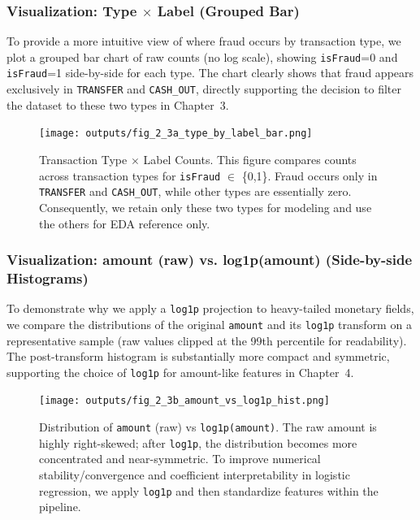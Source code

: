 \documentclass[sigplan,screen]{acmart}
\begin{document}
\subsubsection{Visualization: Type \texorpdfstring{$\times$}{x} Label (Grouped Bar)}
To provide a more intuitive view of where fraud occurs by transaction type, we plot a grouped bar chart of raw counts (no log scale), showing \texttt{isFraud}=0 and \texttt{isFraud}=1 side-by-side for each type. The chart clearly shows that fraud appears exclusively in \texttt{TRANSFER} and \texttt{CASH\_OUT}, directly supporting the decision to filter the dataset to these two types in Chapter~3.
\begin{figure}[h]
  \centering
  \texttt{[image: outputs/fig\_2\_3a\_type\_by\_label\_bar.png]}
  \caption{Transaction Type \texorpdfstring{$\times$}{x} Label Counts. This figure compares counts across transaction types for \texttt{isFraud} \texorpdfstring{$\in$}{∈} \{0,1\}. Fraud occurs only in \texttt{TRANSFER} and \texttt{CASH\_OUT}, while other types are essentially zero. Consequently, we retain only these two types for modeling and use the others for EDA reference only.}
  \label{fig:type-label-bar}
\end{figure}

\subsubsection{Visualization: amount (raw) vs. log1p(amount) (Side-by-side Histograms)}
To demonstrate why we apply a \texttt{log1p} projection to heavy-tailed monetary fields, we compare the distributions of the original \texttt{amount} and its \texttt{log1p} transform on a representative sample (raw values clipped at the 99th percentile for readability). The post-transform histogram is substantially more compact and symmetric, supporting the choice of \texttt{log1p} for amount-like features in Chapter~4.
\begin{figure}[h]
  \centering
  \texttt{[image: outputs/fig\_2\_3b\_amount\_vs\_log1p\_hist.png]}
  \caption{Distribution of \texttt{amount} (raw) vs \texttt{log1p(amount)}. The raw amount is highly right-skewed; after \texttt{log1p}, the distribution becomes more concentrated and near-symmetric. To improve numerical stability/convergence and coefficient interpretability in logistic regression, we apply \texttt{log1p} and then standardize features within the pipeline.}
  \label{fig:amount-log1p-hist}
\end{figure}
\end{document}

